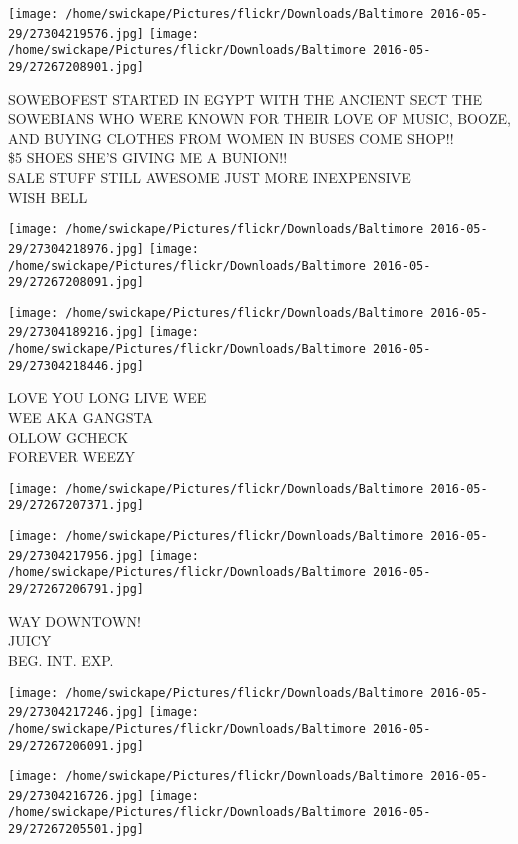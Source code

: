 \documentclass[10pt,letterpaper]{article}
\begin{document}
\texttt{[image: /home/swickape/Pictures/flickr/Downloads/Baltimore 2016-05-29/27304219576.jpg]}
\texttt{[image: /home/swickape/Pictures/flickr/Downloads/Baltimore 2016-05-29/27267208901.jpg]}

SOWEBOFEST STARTED IN EGYPT WITH THE ANCIENT SECT THE SOWEBIANS WHO WERE KNOWN FOR THEIR LOVE OF MUSIC, BOOZE, AND BUYING CLOTHES FROM WOMEN IN BUSES COME SHOP!!\\
\$5 SHOES SHE'S GIVING ME A BUNION!!\\
SALE STUFF STILL AWESOME JUST MORE INEXPENSIVE\\
WISH BELL
\pagebreak

\texttt{[image: /home/swickape/Pictures/flickr/Downloads/Baltimore 2016-05-29/27304218976.jpg]}
\texttt{[image: /home/swickape/Pictures/flickr/Downloads/Baltimore 2016-05-29/27267208091.jpg]}

\texttt{[image: /home/swickape/Pictures/flickr/Downloads/Baltimore 2016-05-29/27304189216.jpg]}
\texttt{[image: /home/swickape/Pictures/flickr/Downloads/Baltimore 2016-05-29/27304218446.jpg]}

LOVE YOU LONG LIVE WEE\\
WEE AKA GANGSTA\\
OLLOW GCHECK\\
FOREVER WEEZY
\pagebreak

\texttt{[image: /home/swickape/Pictures/flickr/Downloads/Baltimore 2016-05-29/27267207371.jpg]}

\vspace{0.25in}
\texttt{[image: /home/swickape/Pictures/flickr/Downloads/Baltimore 2016-05-29/27304217956.jpg]}
\texttt{[image: /home/swickape/Pictures/flickr/Downloads/Baltimore 2016-05-29/27267206791.jpg]}

WAY DOWNTOWN!\\
JUICY\\
BEG. INT. EXP.
\pagebreak

\texttt{[image: /home/swickape/Pictures/flickr/Downloads/Baltimore 2016-05-29/27304217246.jpg]}
\texttt{[image: /home/swickape/Pictures/flickr/Downloads/Baltimore 2016-05-29/27267206091.jpg]}

\texttt{[image: /home/swickape/Pictures/flickr/Downloads/Baltimore 2016-05-29/27304216726.jpg]}
\texttt{[image: /home/swickape/Pictures/flickr/Downloads/Baltimore 2016-05-29/27267205501.jpg]}
\end{document}

